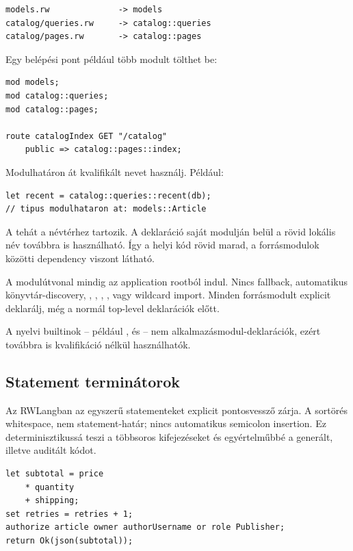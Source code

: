 \begin{lstlisting}
models.rw              -> models
catalog/queries.rw     -> catalog::queries
catalog/pages.rw       -> catalog::pages
\end{lstlisting}

Egy belépési pont például több modult tölthet be:

\begin{lstlisting}[language=RWLang]
mod models;
mod catalog::queries;
mod catalog::pages;

route catalogIndex GET "/catalog"
    public => catalog::pages::index;
\end{lstlisting}

Modulhatáron át kvalifikált nevet használj. Például:

\begin{lstlisting}[language=RWLang]
let recent = catalog::queries::recent(db);
// tipus modulhataron at: models::Article
\end{lstlisting}

A  tehát a  névtérhez tartozik. A deklaráció saját modulján belül a rövid lokális név továbbra is használható. Így a helyi kód rövid marad, a forrásmodulok közötti dependency viszont látható.

A modulútvonal mindig az application rootból indul. Nincs  fallback, automatikus könyvtár-discovery, , , , ,  vagy wildcard import. Minden forrásmodult explicit deklarálj, még a normál top-level deklarációk előtt.

A nyelvi builtinok -- például ,  és  -- nem alkalmazásmodul-deklarációk, ezért továbbra is kvalifikáció nélkül használhatók.

\subsection*{Statement terminátorok}

Az RWLangban az egyszerű statementeket explicit pontosvessző zárja. A sortörés whitespace, nem statement-határ; nincs automatikus semicolon insertion. Ez determinisztikussá teszi a többsoros kifejezéseket és egyértelműbbé a generált, illetve auditált kódot.

\begin{lstlisting}[language=RWLang]
let subtotal = price
    * quantity
    + shipping;
set retries = retries + 1;
authorize article owner authorUsername or role Publisher;
return Ok(json(subtotal));
\end{lstlisting}


